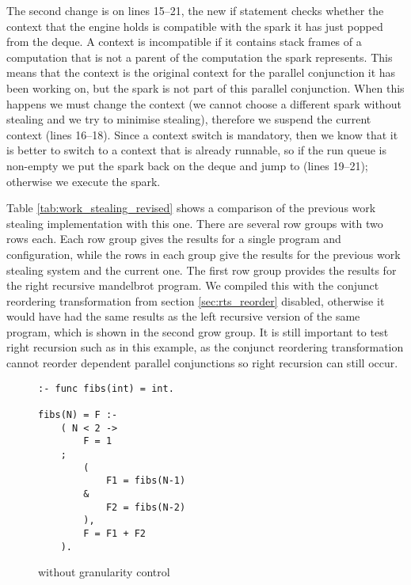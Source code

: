 The second change is on lines 15--21,
the new if statement checks whether the context that the engine holds is
compatible with the spark it has just popped from the deque.
A context is incompatible if it contains stack frames of a computation that
is not a parent of the computation the spark represents.
This means that the context is the original context for the parallel
conjunction it has been working on,
but the spark is not part of this parallel conjunction.
When this happens we must change the context
(we cannot choose a different spark without stealing and we try to minimise
stealing),
therefore we suspend the current context (lines 16--18).
Since a context switch is mandatory, then we know that it is better to
switch to a context that is already runnable,
so if the run queue is non-empty we put the spark back on the deque and jump
to \idle (lines 19--21);
otherwise we execute the spark.



Table \ref{tab:work_stealing_revised} shows a comparison of the previous
work stealing implementation with this one.
There are several row groups with two rows each.
Each row group gives the results for a single program and configuration,
while the rows in each group give the results for the previous work stealing
system and the current one.
The first row group provides the results for the
right recursive mandelbrot program.
We compiled this with the conjunct reordering transformation from section
\ref{sec:rts_reorder} disabled,
otherwise it would have had the same results as the left recursive version
of the same program,
which is shown in the second grow group.
It is still important to test right recursion such as in this example,
as the conjunct reordering transformation cannot reorder dependent parallel
conjunctions so right recursion can still occur.

\begin{figure}
\begin{verbatim}
:- func fibs(int) = int.

fibs(N) = F :-
    ( N < 2 ->
        F = 1
    ;
        (
            F1 = fibs(N-1)
        &
            F2 = fibs(N-2)
        ),
        F = F1 + F2
    ).
\end{verbatim}
\caption{\fibs without granularity control}
\label{fig:fibs}
\end{figure}

